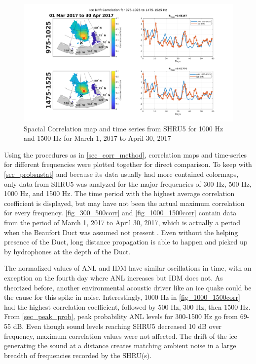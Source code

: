 \begin{figure}[p]
\centering
\includegraphics[scale=0.35]{Figures/1000_1500_spatial_corr_20170301-20170430.png}
\caption{Spacial Correlation map and time series from SHRU5 for 1000 Hz and 1500 Hz for March 1, 2017 to April 30, 2017}
\label{fig_1000_1500corr}
\end{figure}

Using the procedures as in \autoref{sec_corr_method}, correlation maps and time-series for different frequencies were plotted together for direct comparison. To keep with \autoref{sec_probsnstat} and because its data usually had more contained colormaps, only data from SHRU5 was analyzed for the major frequencies of 300 Hz, 500 Hz, 1000 Hz, and 1500 Hz. The time period with the highest average correlation coefficient is displayed, but may have not been the actual maximum correlation for every frequency. \autoref{fig_300_500corr} and \autoref{fig_1000_1500corr} contain data from the period of March 1, 2017 to April 30, 2017, which is actually a period when the Beaufort Duct was assumed not present \parencite{ballard2020yearlong}. Even without the helping presence of the Duct, long distance propagation is able to happen and picked up by hydrophones at the depth of the Duct. 

The normalized values of ANL and IDM have similar oscillations in time, with an exception on the fourth day where ANL increases but IDM does not. As theorized before, another environmental acoustic driver like an ice quake could be the cause for this spike in noise. Interestingly, 1000 Hz in \autoref{fig_1000_1500corr} had the highest correlation coefficient, followed by 500 Hz, 300 Hz, then 1500 Hz. From \autoref{sec_peak_prob}, peak probability ANL levels for 300-1500 Hz go from 69-55 dB. Even though sound levels reaching SHRU5 decreased 10 dB over frequency, maximum correlation values were not affected. The drift of the ice generating the sound at a distance creates matching ambient noise in a large breadth of frequencies recorded by the SHRU(s). 

